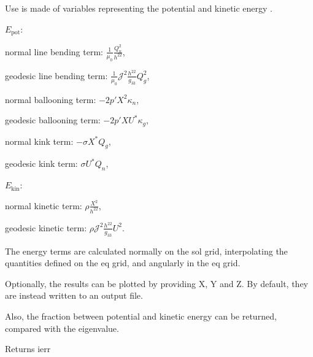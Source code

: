 Use is made of variables representing the potential and kinetic energy \cite{Weyens3D}.
\begin{DoxyItemize}
\item $E_\text{pot}$\+:
\begin{DoxyItemize}
\item normal line bending term\+: $\frac{1}{\mu_0} \frac{Q_n^2}{h^{22}}$,
\item geodesic line bending term\+: $\frac{1}{\mu_0} \mathcal{J}^2 \frac{h^{22}}{g_{33}} Q_g^2$,
\item normal ballooning term\+: $-2 p' X^2 \kappa_n$,
\item geodesic ballooning term\+: $-2 p' X U^* \kappa_g$,
\item normal kink term\+: $-\sigma X^*Q_g$,
\item geodesic kink term\+: $\sigma U^*Q_n$,
\end{DoxyItemize}
\item $E_\text{kin}$\+:
\begin{DoxyItemize}
\item normal kinetic term\+: $\rho \frac{X^2}{h^{22}}$,
\item geodesic kinetic term\+: $\rho \mathcal{J}^2 \frac{h^{22}}{g_{33}} U^2$.
\end{DoxyItemize}
\end{DoxyItemize}

The energy terms are calculated normally on the sol grid, interpolating the quantities defined on the eq grid, and angularly in the eq grid.

Optionally, the results can be plotted by providing X, Y and Z. By default, they are instead written to an output file.

Also, the fraction between potential and kinetic energy can be returned, compared with the eigenvalue.

\begin{DoxyReturn}{Returns}
ierr
\end{DoxyReturn}

